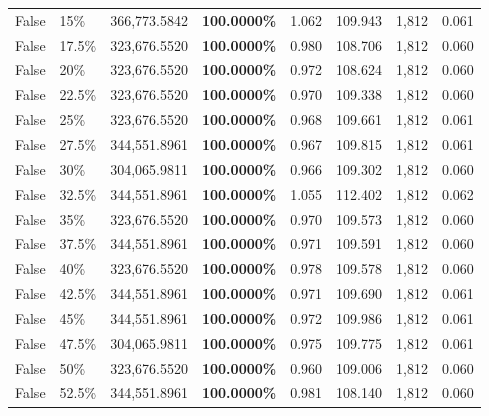 \begin{table}[H]
\begin{tabular}{lllrllll}
\cline{1-8} \cline{2-8}
False & 15\% & 366,773.5842 & \bfseries \color{red} 100.0000\% & 1.062 & 109.943 & 1,812 & 0.061 \\
\cline{1-8} \cline{2-8}
False & 17.5\% & 323,676.5520 & \bfseries \color{red} 100.0000\% & 0.980 & 108.706 & 1,812 & 0.060 \\
\cline{1-8} \cline{2-8}
False & 20\% & 323,676.5520 & \bfseries \color{red} 100.0000\% & 0.972 & 108.624 & 1,812 & 0.060 \\
\cline{1-8} \cline{2-8}
False & 22.5\% & 323,676.5520 & \bfseries \color{red} 100.0000\% & 0.970 & 109.338 & 1,812 & 0.060 \\
\cline{1-8} \cline{2-8}
False & 25\% & 323,676.5520 & \bfseries \color{red} 100.0000\% & 0.968 & 109.661 & 1,812 & 0.061 \\
\cline{1-8} \cline{2-8}
False & 27.5\% & 344,551.8961 & \bfseries \color{red} 100.0000\% & 0.967 & 109.815 & 1,812 & 0.061 \\
\cline{1-8} \cline{2-8}
False & 30\% & \color{red} 304,065.9811 & \bfseries \color{red} 100.0000\% & 0.966 & 109.302 & 1,812 & 0.060 \\
\cline{1-8} \cline{2-8}
False & 32.5\% & 344,551.8961 & \bfseries \color{red} 100.0000\% & 1.055 & 112.402 & 1,812 & 0.062 \\
\cline{1-8} \cline{2-8}
False & 35\% & 323,676.5520 & \bfseries \color{red} 100.0000\% & 0.970 & 109.573 & 1,812 & 0.060 \\
\cline{1-8} \cline{2-8}
False & 37.5\% & 344,551.8961 & \bfseries \color{red} 100.0000\% & 0.971 & 109.591 & 1,812 & 0.060 \\
\cline{1-8} \cline{2-8}
False & 40\% & 323,676.5520 & \bfseries \color{red} 100.0000\% & 0.978 & 109.578 & 1,812 & 0.060 \\
\cline{1-8} \cline{2-8}
False & 42.5\% & 344,551.8961 & \bfseries \color{red} 100.0000\% & 0.971 & 109.690 & 1,812 & 0.061 \\
\cline{1-8} \cline{2-8}
False & 45\% & 344,551.8961 & \bfseries \color{red} 100.0000\% & 0.972 & 109.986 & 1,812 & 0.061 \\
\cline{1-8} \cline{2-8}
False & 47.5\% & \color{red} 304,065.9811 & \bfseries \color{red} 100.0000\% & 0.975 & 109.775 & 1,812 & 0.061 \\
\cline{1-8} \cline{2-8}
False & 50\% & 323,676.5520 & \bfseries \color{red} 100.0000\% & 0.960 & 109.006 & 1,812 & 0.060 \\
\cline{1-8} \cline{2-8}
False & 52.5\% & 344,551.8961 & \bfseries \color{red} 100.0000\% & 0.981 & 108.140 & 1,812 & 0.060 \\

\end{tabular}
\end{table}

